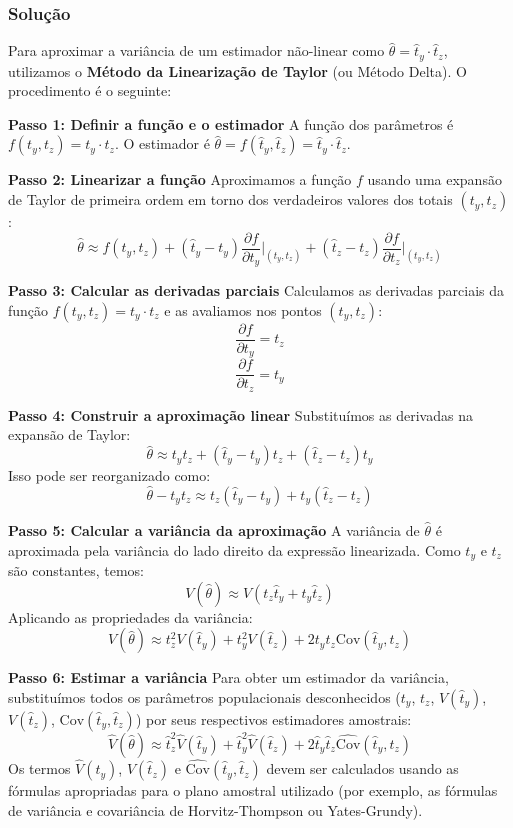 \documentclass{article}
\begin{document}
\subsubsection*{Solução}
Para aproximar a variância de um estimador não-linear como $\hat{\theta} = \hat{t}_y \cdot \hat{t}_z$, utilizamos o \textbf{Método da Linearização de Taylor} (ou Método Delta). O procedimento é o seguinte:

\textbf{Passo 1: Definir a função e o estimador}
A função dos parâmetros é $f(t_y, t_z) = t_y \cdot t_z$. O estimador é $\hat{\theta} = f(\hat{t}_y, \hat{t}_z) = \hat{t}_y \cdot \hat{t}_z$.

\textbf{Passo 2: Linearizar a função}
Aproximamos a função $f$ usando uma expansão de Taylor de primeira ordem em torno dos verdadeiros valores dos totais $(t_y, t_z)$:
\[ \hat{\theta} \approx f(t_y, t_z) + (\hat{t}_y - t_y) \frac{\partial f}{\partial t_y} \bigg|_{(t_y, t_z)} + (\hat{t}_z - t_z) \frac{\partial f}{\partial t_z} \bigg|_{(t_y, t_z)} \]

\textbf{Passo 3: Calcular as derivadas parciais}
Calculamos as derivadas parciais da função $f(t_y, t_z) = t_y \cdot t_z$ e as avaliamos nos pontos $(t_y, t_z)$:
\[ \frac{\partial f}{\partial t_y} = t_z \]
\[ \frac{\partial f}{\partial t_z} = t_y \]

\textbf{Passo 4: Construir a aproximação linear}
Substituímos as derivadas na expansão de Taylor:
\[ \hat{\theta} \approx t_y t_z + (\hat{t}_y - t_y) t_z + (\hat{t}_z - t_z) t_y \]
Isso pode ser reorganizado como:
\[ \hat{\theta} - t_y t_z \approx t_z (\hat{t}_y - t_y) + t_y (\hat{t}_z - t_z) \]

\textbf{Passo 5: Calcular a variância da aproximação}
A variância de $\hat{\theta}$ é aproximada pela variância do lado direito da expressão linearizada. Como $t_y$ e $t_z$ são constantes, temos:
\[ V(\hat{\theta}) \approx V \left( t_z \hat{t}_y + t_y \hat{t}_z \right) \]
Aplicando as propriedades da variância:
\[ V(\hat{\theta}) \approx t_z^2 V(\hat{t}_y) + t_y^2 V(\hat{t}_z) + 2 t_y t_z \text{Cov}(\hat{t}_y, \hat{t}_z) \]

\textbf{Passo 6: Estimar a variância}
Para obter um estimador da variância, substituímos todos os parâmetros populacionais desconhecidos ($t_y$, $t_z$, $V(\hat{t}_y)$, $V(\hat{t}_z)$, $\text{Cov}(\hat{t}_y, \hat{t}_z)$) por seus respectivos estimadores amostrais:
\[ \hat{V}(\hat{\theta}) \approx \hat{t}_z^2 \hat{V}(\hat{t}_y) + \hat{t}_y^2 \hat{V}(\hat{t}_z) + 2 \hat{t}_y \hat{t}_z \widehat{\text{Cov}}(\hat{t}_y, \hat{t}_z) \]
Os termos $\hat{V}(\hat{t}_y)$, $\hat{V}(\hat{t}_z)$ e $\widehat{\text{Cov}}(\hat{t}_y, \hat{t}_z)$ devem ser calculados usando as fórmulas apropriadas para o plano amostral utilizado (por exemplo, as fórmulas de variância e covariância de Horvitz-Thompson ou Yates-Grundy).
\end{document}
